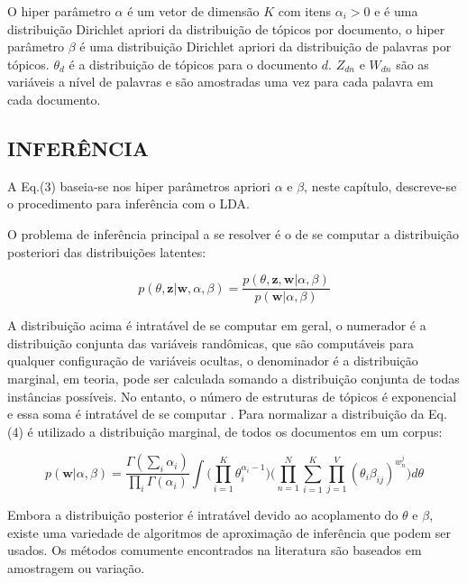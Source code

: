 \documentclass[12pt,a4paper]{article}
\begin{document}
O hiper parâmetro $\alpha$ é um vetor de dimensão $K$ com itens \(\alpha _i>0\) e é uma distribuição Dirichlet apriori da distribuição de tópicos por documento,
o hiper parâmetro $\beta$ é uma distribuição Dirichlet apriori da distribuição de palavras por tópicos. $\theta _d$ é a distribuição de tópicos para o documento $d$. $Z_{dn}$ e $W_{dn}$ são as variáveis a nível de palavras e são amostradas uma vez para cada palavra em cada documento.


\subsection{INFERÊNCIA} \label{sec:inferencia}
A Eq.(3) baseia-se nos hiper parâmetros apriori $\alpha$ e $\beta$, neste capítulo, descreve-se o procedimento para inferência com o LDA.

O problema de inferência principal a se resolver é o de se computar a distribuição posteriori das distribuições latentes:

\begin{equation}
p(\theta,\textbf{z}|\textbf{w},\alpha,\beta) = \frac{p(\theta,\textbf{z},\textbf{w}|\alpha,\beta)}{p(\textbf{w}|\alpha,\beta)}
\end{equation}

A distribuição acima é intratável de se computar em geral, o numerador é a distribuição conjunta das variáveis randômicas, que são computáveis para qualquer configuração de variáveis ocultas,
 o denominador é a distribuição marginal, em teoria, pode ser calculada somando a distribuição conjunta de todas instâncias possíveis. No entanto,
 o número de estruturas de tópicos é exponencial e essa soma é intratável de se computar \cite{blei2012probabilistic}. Para normalizar a distribuição da Eq.(4) é utilizado a distribuição marginal,
 de todos os documentos em um corpus:

\begin{equation}
p(\textbf{w}|\alpha,\beta)=\frac{\Gamma(\sum_{i}\alpha_i)}{\prod_{i}\Gamma(\alpha_i)}\int{\Bigg(\prod_{i=1}^{K}\theta_i^{\alpha_i-1}\Bigg)} \Bigg(\prod_{n=1}^{N}\sum_{i=1}^{K}\prod_{j=1}^{V}(\theta_i\beta_{ij})^{w_n^j}\Bigg)d\theta
\end{equation}

Embora a distribuição posterior é intratável devido ao acoplamento do $\theta$ e $\beta$, existe uma variedade de algoritmos de aproximação de inferência que podem ser usados. Os métodos comumente encontrados na literatura são baseados em amostragem ou variação.
\end{document}
